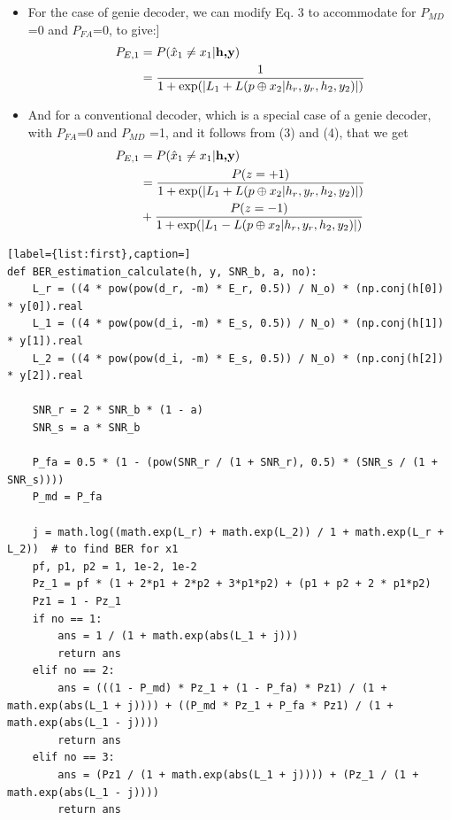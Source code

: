 \documentclass[conference]{IEEEtran}
\begin{document}
\begin{itemize}
\item For the case of genie decoder, we can modify Eq. 3 to accommodate for $P_{MD}$=0 and $P_{FA}$=0, to give:]
\begin{equation}
\begin{split}
P_{E,1} & = P(\hat x_1\neq x_1 | \textbf{h,y})\\
 & = {1\over 1+\exp(| L_{1}+L(p\oplus x_{2}| h_{r},y_{r},h_{2},y_{2})|)}\\
\end{split}
\end{equation}
\item And for a conventional decoder, which is a special case of a genie decoder, with $P_{FA}$=0 and $P_{MD}$ =1, and it follows from (3) and (4), that we get
\begin{equation}
\begin{split}
P_{E,1} & = P(\hat x_1\neq x_1 | \textbf{h,y})\\
 & = {P(z=+1)\over 1+\exp(| L_{1}+L(p\oplus x_{2}| h_{r},y_{r},h_{2},y_{2})|)}\\
 &+ {P(z=-1)\over 1+\exp(|L_{1}-L(p\oplus x_{2}| h_{r},y_{r},h_{2},y_{2})|)}
\end{split}
\end{equation}
\end{itemize}
\begin{lstlisting}[label={list:first},caption=]
def BER_estimation_calculate(h, y, SNR_b, a, no):
    L_r = ((4 * pow(pow(d_r, -m) * E_r, 0.5)) / N_o) * (np.conj(h[0]) * y[0]).real
    L_1 = ((4 * pow(pow(d_i, -m) * E_s, 0.5)) / N_o) * (np.conj(h[1]) * y[1]).real
    L_2 = ((4 * pow(pow(d_i, -m) * E_s, 0.5)) / N_o) * (np.conj(h[2]) * y[2]).real

    SNR_r = 2 * SNR_b * (1 - a)
    SNR_s = a * SNR_b

    P_fa = 0.5 * (1 - (pow(SNR_r / (1 + SNR_r), 0.5) * (SNR_s / (1 + SNR_s))))
    P_md = P_fa

    j = math.log((math.exp(L_r) + math.exp(L_2)) / 1 + math.exp(L_r + L_2))  # to find BER for x1
    pf, p1, p2 = 1, 1e-2, 1e-2
    Pz_1 = pf * (1 + 2*p1 + 2*p2 + 3*p1*p2) + (p1 + p2 + 2 * p1*p2)
    Pz1 = 1 - Pz_1
    if no == 1:
        ans = 1 / (1 + math.exp(abs(L_1 + j)))
        return ans
    elif no == 2:
        ans = (((1 - P_md) * Pz_1 + (1 - P_fa) * Pz1) / (1 + math.exp(abs(L_1 + j)))) + ((P_md * Pz_1 + P_fa * Pz1) / (1 + math.exp(abs(L_1 - j))))
        return ans
    elif no == 3:
        ans = (Pz1 / (1 + math.exp(abs(L_1 + j)))) + (Pz_1 / (1 + math.exp(abs(L_1 - j))))
        return ans
\end{lstlisting}
\end{document}
